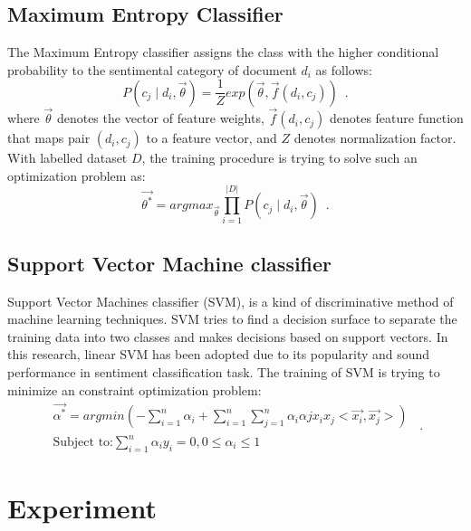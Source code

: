 \documentclass{llncs}
\begin{document}
\subsection{Maximum Entropy Classifier}
\label{entropy}
The Maximum Entropy classifier assigns the class with the higher conditional probability to the sentimental category of document $ d_{i} $ as follows:
\begin{equation}
\label{e5}
P \left( c_{j} \mid d_{i}, \overrightarrow{\theta} \right) = \frac{1}{Z}exp \left( \overrightarrow{\theta}, \overrightarrow{f} \left( d_{i},c_{j} \right) \right) \enspace .
\end{equation}
where $ \overrightarrow{\theta} $ denotes the vector of feature weights, $ \overrightarrow{f} \left( d_{i}, c_{j} \right)$ denotes feature function that maps pair $ \left( d_{i}, c_{j} \right) $ to a feature vector, and $ Z $ denotes normalization factor.
With labelled dataset $ D $, the training procedure is trying to solve such an optimization problem as:
\begin{equation}
\label{e6}
\overrightarrow{\theta^{\ast}}=argmax_{\overrightarrow{\theta}}\prod_{i=1}^{|D|} P \left( c_{j} \mid d_{i}, \overrightarrow{\theta} \right) \enspace .
\end{equation} 
\subsection{Support Vector Machine classifier}
\label{svm}
Support Vector Machines classifier (SVM), is a kind of discriminative method of machine learning techniques.
SVM tries to find a decision surface to separate the training data into two classes and makes decisions based on support vectors. 
In this research, linear SVM has been adopted due to its popularity and sound performance in sentiment classification task.
The training of SVM is trying to minimize an constraint optimization problem:
\begin{equation}
\label{e7}
\begin{aligned}
\overrightarrow{\alpha^{\ast}}=argmin \left( -\sum_{i=1}^{n}\alpha_{i} + \sum_{i=1}^{n} \sum_{j=1}^{n}\alpha_{i}\alpha{j} x_{i}x_{j}<\overrightarrow{x_{i}},\overrightarrow{x_{j}}> \right)\\
\mbox{Subject to:} \sum_{i=1}^{n}\alpha_{i}y_{i}=0 , 0\leqslant \alpha_{i} \leqslant 1
\end{aligned} \enspace .
\end{equation}
\section{Experiment}
\label{experiment}
\end{document}
